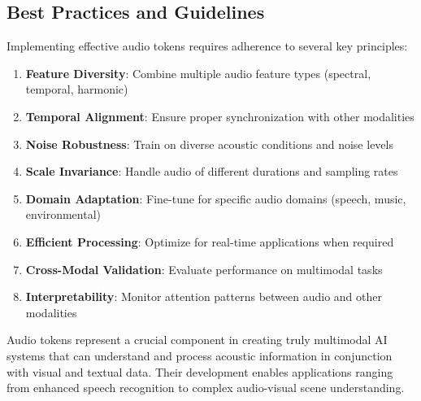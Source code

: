 \subsection{Best Practices and Guidelines}

Implementing effective audio tokens requires adherence to several key principles:

\begin{enumerate}
\item \textbf{Feature Diversity}: Combine multiple audio feature types (spectral, temporal, harmonic)
\item \textbf{Temporal Alignment}: Ensure proper synchronization with other modalities
\item \textbf{Noise Robustness}: Train on diverse acoustic conditions and noise levels
\item \textbf{Scale Invariance}: Handle audio of different durations and sampling rates
\item \textbf{Domain Adaptation}: Fine-tune for specific audio domains (speech, music, environmental)
\item \textbf{Efficient Processing}: Optimize for real-time applications when required
\item \textbf{Cross-Modal Validation}: Evaluate performance on multimodal tasks
\item \textbf{Interpretability}: Monitor attention patterns between audio and other modalities
\end{enumerate}
\begin{comment}
Feedback: This is a great list. To make it more actionable:
1.  **Feature Diversity**: "Start with log-Mel spectrograms as a strong, general-purpose feature. If your task involves music, consider adding features like chroma or pitch to provide more relevant information to the model."
2.  **Temporal Alignment**: "When working with video, be aware of potential audio-visual desynchronization in your dataset. A common preprocessing step is to use a tool like FFmpeg to verify and correct the alignment between audio and video streams."
3.  **Noise Robustness**: "Incorporate audio-specific data augmentation during training. Libraries like `audiomentations` can add background noise, reverberation, and pitch shifts, which can significantly improve the model's real-world performance."
\end{comment}

Audio tokens represent a crucial component in creating truly multimodal AI systems that can understand and process acoustic information in conjunction with visual and textual data. Their development enables applications ranging from enhanced speech recognition to complex audio-visual scene understanding.
